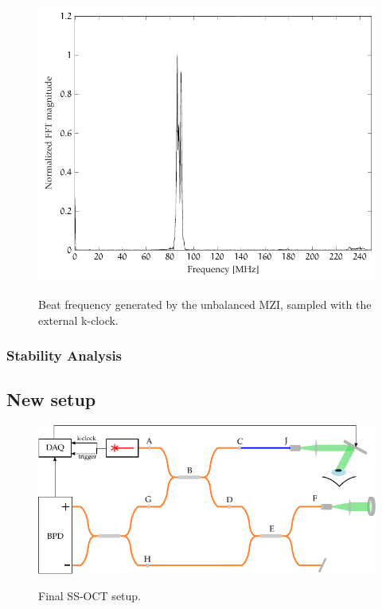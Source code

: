 \begin{figure}[hbt]
{\myfloatalign
\includegraphics[width=\linewidth]{gfx/tikz/interferometer/external-clock/frequency}}
\caption{Beat frequency generated by the unbalanced \ac{MZI}, sampled with the external k-clock.}\label{fig:mzi-external}
\end{figure}


\subsubsection{Stability Analysis}


\subsection{New setup}
\begin{figure}[bth]
\myfloatalign
{\includegraphics[width=\linewidth]{gfx/setup-diagrams/final-setup.pdf}}
\caption{Final SS-OCT setup.}\label{fig:final-setup}
\end{figure}

